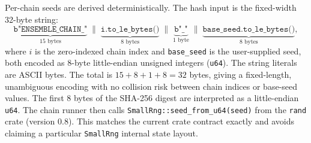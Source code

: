 Per-chain seeds are derived deterministically.
The hash input is the fixed-width 32-byte string:
\[
  \underbrace{\texttt{b"ENSEMBLE\_CHAIN\_"}}_{15\text{ bytes}}
  \;\|\;
  \underbrace{\texttt{i.to\_le\_bytes()}}_{8\text{ bytes}}
  \;\|\;
  \underbrace{\texttt{b"\_"}}_{1\text{ byte}}
  \;\|\;
  \underbrace{\texttt{base\_seed.to\_le\_bytes()}}_{8\text{ bytes}},
\]
where $i$ is the zero-indexed chain index and \texttt{base\_seed} is
the user-supplied seed, both encoded as 8-byte little-endian unsigned
integers (\texttt{u64}).
The string literals are ASCII bytes.
The total is $15 + 8 + 1 + 8 = 32$ bytes, giving a
fixed-length, unambiguous encoding with no collision risk between chain
indices or base-seed values.
The first 8 bytes of the SHA-256 digest are interpreted as a little-endian
\texttt{u64}. The chain runner then calls
\texttt{SmallRng::seed\_from\_u64(seed)} from the \texttt{rand} crate
(version 0.8). This matches the current crate contract exactly and avoids
claiming a particular \texttt{SmallRng} internal state layout.
